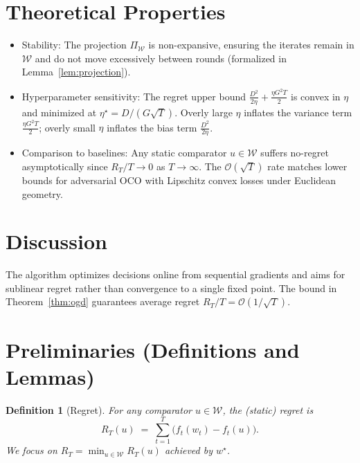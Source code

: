 \documentclass[12pt]{article}
\newtheorem{definition}{Definition}
\begin{document}
\section*{Theoretical Properties}
\begin{itemize}[leftmargin=2em]
\item Stability: The projection $\Pi_{\mathcal{W}}$ is non-expansive, ensuring the iterates remain in $\mathcal{W}$ and do not move excessively between rounds (formalized in Lemma~\ref{lem:projection}).
\item Hyperparameter sensitivity: The regret upper bound $\frac{D^2}{2\eta} + \frac{\eta G^2 T}{2}$ is convex in $\eta$ and minimized at $\eta^\star = D/(G\sqrt{T})$. Overly large $\eta$ inflates the variance term $\frac{\eta G^2 T}{2}$; overly small $\eta$ inflates the bias term $\frac{D^2}{2\eta}$.
\item Comparison to baselines: Any static comparator $u\in\mathcal{W}$ suffers no-regret asymptotically since $R_T/T \to 0$ as $T\to\infty$. The $\mathcal{O}(\sqrt{T})$ rate matches lower bounds for adversarial OCO with Lipschitz convex losses under Euclidean geometry.
\end{itemize}

\section*{Discussion}
The algorithm optimizes decisions online from sequential gradients and aims for sublinear regret rather than convergence to a single fixed point. The bound in Theorem~\ref{thm:ogd} guarantees average regret $R_T/T = \mathcal{O}(1/\sqrt{T})$.

\section*{Preliminaries (Definitions and Lemmas)}
\begin{definition}[Regret]
For any comparator $u\in\mathcal{W}$, the (static) regret is
\[
R_T(u) \;=\; \sum_{t=1}^T \bigl(f_t(w_t) - f_t(u)\bigr).
\]
We focus on $R_T = \min_{u\in \mathcal{W}} R_T(u)$ achieved by $w^\star$.
\end{definition}
\end{document}
